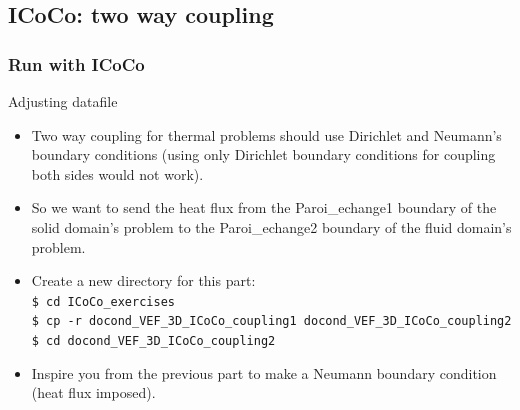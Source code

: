 \documentclass[10pt, hyperref={unicode=true,pdfusetitle, bookmarks=true,bookmarksnumbered=false,bookmarksopen=false, breaklinks=false,pdfborder={0 0 1},backref=true,colorlinks=true,linkcolor=darkblue,pageanchor, urlcolor=darkblue}]{beamer}
\begin{document}
\subsection{{\bf{ICoCo: two way coupling}}}
\begin{frame}
\end{frame}
\begin{frame}
\frametitle{Run with ICoCo}

\begin{block}{Adjusting datafile}
\begin{itemize}
\item Two way coupling for thermal problems should use Dirichlet and Neumann's boundary conditions (using only Dirichlet boundary conditions for coupling both sides would not work).
\item So we want to send the heat flux from the Paroi\_echange1 boundary of the solid domain's problem to the Paroi\_echange2 boundary of the fluid domain's problem.
\item Create a new directory for this part:\\
\texttt{\$ cd ICoCo\_exercises}\\
\texttt{\$ cp -r docond\_VEF\_3D\_ICoCo\_coupling1 docond\_VEF\_3D\_ICoCo\_coupling2}\\
\texttt{\$ cd docond\_VEF\_3D\_ICoCo\_coupling2}\\
\item Inspire you from the previous part to make a Neumann boundary condition (heat flux imposed).

\end{itemize}
\end{block}

\end{frame}
\end{document}
